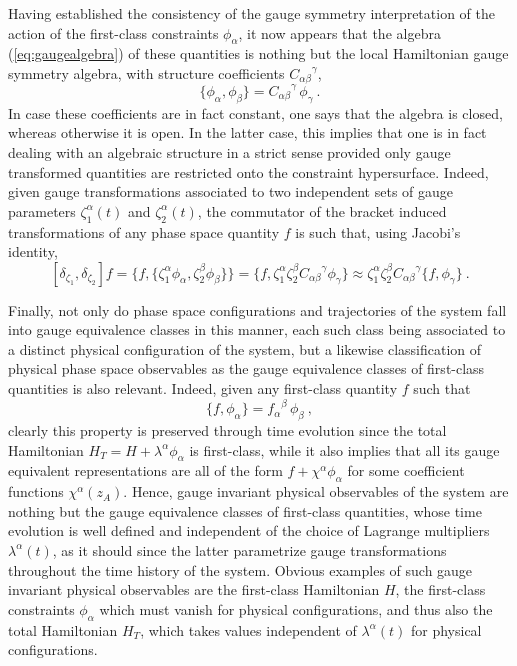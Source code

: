 \documentclass[a4paper,11pt]{article}
\begin{document}
Having established the consistency of the gauge symmetry interpretation
of the action of the first-class constraints $\phi_\alpha$, it now appears
that the algebra (\ref{eq:gaugealgebra}) of these quantities is nothing
but the local Hamiltonian gauge symmetry algebra, with structure
coefficients ${C_{\alpha\beta}}^\gamma$,
\begin{equation}
\{\phi_\alpha,\phi_\beta\}={C_{\alpha\beta}}^\gamma\,\phi_\gamma\ .
\end{equation}
In case these coefficients are in fact constant, one says that the
algebra is closed, whereas otherwise it is open. In the latter case,
this implies that one is in fact dealing with an algebraic structure in a 
strict sense provided only gauge transformed quantities are restricted onto 
the constraint hypersurface. Indeed, given gauge transformations associated
to two independent sets of gauge parameters $\zeta^\alpha_1(t)$ and 
$\zeta^\alpha_2(t)$, the commutator of the bracket induced transformations
of any phase space quantity $f$ is such that, using Jacobi's identity,
\begin{equation}
\left[\delta_{\zeta_1},\delta_{\zeta_2}\right]f=
\{f,\{\zeta^\alpha_1\phi_\alpha,\zeta^\beta_2\phi_\beta\}\}=
\{f,\zeta^\alpha_1\zeta^\beta_2{C_{\alpha\beta}}^\gamma\phi_\gamma\}
\approx\zeta^\alpha_1\zeta^\beta_2{C_{\alpha\beta}}^\gamma
\{f,\phi_\gamma\}\ .
\end{equation}

Finally, not only do phase space configurations and trajectories of the
system fall into gauge equivalence classes in this manner, each such class
being associated to a distinct physical configuration of the system,
but a likewise classification of physical phase space observables as
the gauge equivalence classes of first-class quantities is also relevant.
Indeed, given any first-class quantity $f$ such that
\begin{equation}
\{f,\phi_\alpha\}={f_\alpha}^\beta\,\phi_\beta\ ,
\end{equation}
clearly this property is preserved through time evolution since the
total Hamiltonian $H_T=H+\lambda^\alpha\phi_\alpha$ is first-class,
while it also implies that all its gauge equivalent representations are
all of the form $f+\chi^\alpha\phi_\alpha$ for some coefficient functions
$\chi^\alpha(z_A)$. Hence, gauge invariant physical observables of the
system are nothing but the gauge equivalence classes of first-class
quantities, whose time evolution is well defined and independent of the
choice of Lagrange multipliers $\lambda^\alpha(t)$, as it should since the
latter parametrize gauge transformations throughout the time history of
the system. Obvious examples of such gauge invariant physical observables are
the first-class Hamiltonian $H$, the first-class constraints $\phi_\alpha$
which must vanish for physical configurations, and thus also the total
Hamiltonian $H_T$, which takes values independent of $\lambda^\alpha(t)$
for physical configurations.
\end{document}
